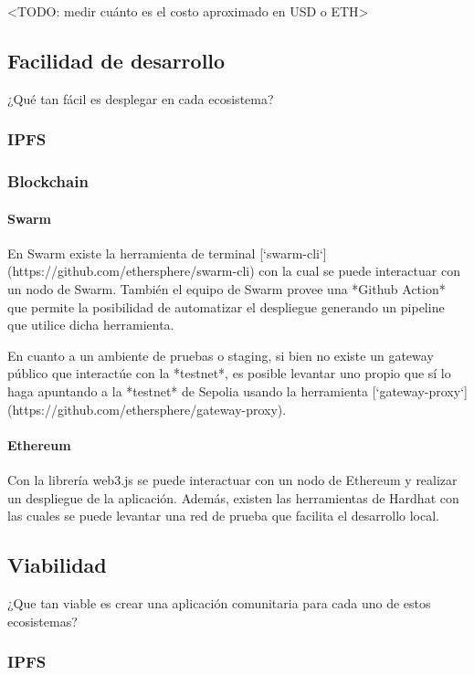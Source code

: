 <TODO: medir cuánto es el costo aproximado en USD o ETH>

\subsection{Facilidad de desarrollo}

¿Qué tan fácil es desplegar en cada ecosistema?

\subsubsection{IPFS}

\subsubsection{Blockchain}

\paragraph{Swarm}
En Swarm existe la herramienta de terminal [`swarm-cli`](https://github.com/ethersphere/swarm-cli) con la cual se puede interactuar con un nodo de Swarm. También el equipo de Swarm provee una *Github Action* que permite la posibilidad de automatizar el despliegue generando un pipeline que utilice dicha herramienta.

En cuanto a un ambiente de pruebas o staging, si bien no existe un gateway público que interactúe con la *testnet*, es posible levantar uno propio que sí lo haga apuntando a la *testnet* de Sepolia usando la herramienta [`gateway-proxy`](https://github.com/ethersphere/gateway-proxy).

\paragraph{Ethereum}
Con la librería web3.js se puede interactuar con un nodo de Ethereum y realizar un despliegue de la aplicación. Además, existen las herramientas de Hardhat con las cuales se puede levantar una red de prueba que facilita el desarrollo local.

\subsection{Viabilidad} 

¿Que tan viable es crear una aplicación comunitaria para cada uno de estos ecosistemas?

\subsubsection{IPFS}

